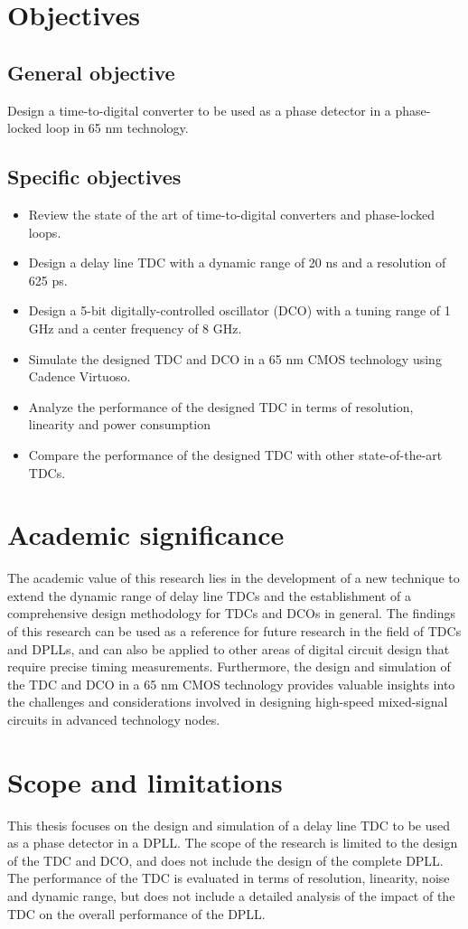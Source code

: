 \section{Objectives}
\subsection{General objective}
Design a time-to-digital converter to be used as a phase detector in a phase-locked loop in 65 nm technology.
\subsection{Specific objectives}
\begin{itemize}
    \item Review the state of the art of time-to-digital converters and phase-locked loops.
    \item Design a delay line TDC with a dynamic range of 20 ns and a resolution of 625 ps.
    \item Design a 5-bit digitally-controlled oscillator (DCO) with a tuning range of 1 GHz and a center frequency of 8 GHz.
    \item Simulate the designed TDC and DCO in a 65 nm CMOS technology using Cadence Virtuoso.
    \item Analyze the performance of the designed TDC in terms of resolution, linearity and power consumption
    \item Compare the performance of the designed TDC with other state-of-the-art TDCs.
\end{itemize}

\section{Academic significance}
The academic value of this research lies in the development of a new technique to extend the dynamic range of delay line TDCs and the establishment of a comprehensive design methodology for TDCs and DCOs in
general. The findings of this research can be used as a reference for future research in the field of TDCs and DPLLs, and can also be applied to other areas of digital circuit design that require precise
timing measurements. Furthermore, the design and simulation of the TDC and DCO in a 65 nm CMOS technology provides valuable insights into the challenges and considerations involved in designing high-speed
mixed-signal circuits in advanced technology nodes.

\section{Scope and limitations}
This thesis focuses on the design and simulation of a delay line TDC to be used as a phase detector in a DPLL. The scope of the research is limited to the design of the TDC and DCO, and does not include the
design of the complete DPLL. The performance of the TDC is evaluated in terms of resolution, linearity, noise and dynamic range, but does not include a detailed analysis of the impact of the TDC on the overall
performance of the DPLL.

